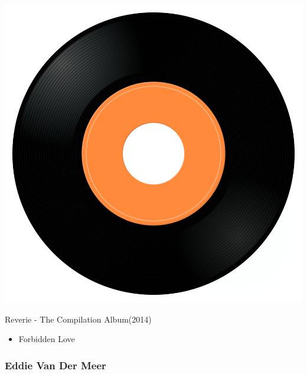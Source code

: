 \begin{minipage}[t]{0.25\textwidth}\vspace{0pt}
\captionsetup{type=figure}
\includegraphics[width=\textwidth]{Images/cover.png}
\caption*{Reverie - The Compilation Album(2014)}
\end{minipage}
\begin{minipage}[t]{0.25\textwidth}\vspace{0pt}
\begin{itemize}[nosep,leftmargin=1em,labelwidth=*,align=left]
	\setlength{\itemsep}{0pt}
	\item Forbidden Love
\end{itemize}
\end{minipage}


\subsubsection{Eddie Van Der Meer}

